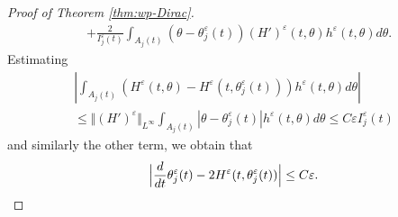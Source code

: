 \documentclass[10pt]{amsart}
\theoremstyle{plain}
\theoremstyle{definition}
\newcommand{\nrm}[1]{\Vert#1\Vert}
\let\tht\theta
\let\varep\varepsilon
\begin{document}
\begin{proof}[Proof of Theorem \ref{thm:wp-Dirac}]
\begin{equation*}
\begin{split}
& + \frac{2}{I_{j}^{\varep}(t) }\int_{A_{j}(t)} (\tht - \tht^\varep_j(t))(H')^\varep(t,\tht) h^\varep(t,\tht) d\tht.
\end{split}
\end{equation*}
Estimating
\begin{multline*}
\left| \int_{A_{j}(t)} (H^\varep(t,\tht) - H^\varep(t,\tht_{j}^{\varep}(t))) h^\varep(t,\tht) d\tht\right|\\
\le \nrm{ (H')^\varep }_{L^\infty} \int_{A_{j}(t)} |\tht -\tht_{j}^{\varep}(t) |h^\varep(t,\tht) d\tht \le C\varep I_j^{\varep}(t)
\end{multline*}
and similarly the other term, we obtain that
\begin{equation}\label{eq:ODE-tht-varep}
\Bigl| \frac{d}{dt} \tht_{j}^{\varep}(t) - 2H^{\varep}(t, \tht_{j}^{\varep}(t)) \Bigr| \le C\varep.
\end{equation}


\end{proof}
\end{document}
